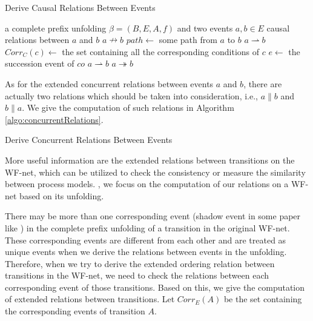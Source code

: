 \documentclass{llncs}
\begin{document}
\begin{algorithm}
\caption{Derive Causal Relations Between Events}
\label{algo:causalRelations}
	\begin{algorithmic}
		\Require a complete prefix unfolding $\beta=(B,E,A,f)$ and two events $a,b\in E$
		\Ensure causal relations between $a$ and $b$
			\State \Return $a\nrightarrow b$
		\EndIf
		\State $path\gets$ some path from $a$ to $b$
			\State \Return $a\rightharpoonup b$
		\Else
				\State $Corr_{C}(c)\gets$ the set containing all the corresponding conditions of $c$
					\State $e\gets$ the succession event of $co$
						\State \Return $a\rightharpoonup b$
					\EndIf
				\EndFor
			\EndFor
		\EndIf
		\State \Return $a\twoheadrightarrow b$
	\end{algorithmic}
\end{algorithm}

As for the extended concurrent relations between events $a$ and $b$, there are actually two relations which should be taken into consideration, i.e., $a\parallel b$ and $b\parallel a$. We give the computation of such relations in Algorithm \ref{algo:concurrentRelations}.

\begin{algorithm}
\caption{Derive Concurrent Relations Between Events}
\label{algo:concurrentRelations}
	\begin{algorithmic}
	\Ensure
	\end{algorithmic}
\end{algorithm}

More useful information are the extended relations between transitions on the WF-net, which can be utilized to check the consistency or measure the similarity between process models. , we focus on the computation of our relations on a WF-net based on its unfolding.

There may be more than one corresponding event (shadow event in some paper like \cite{wang2013efficient}) in the complete prefix unfolding of a transition in the original WF-net. These corresponding events are different from each other and are treated as unique events when we derive the relations between events in the unfolding. Therefore, when we try to derive the extended ordering relation between transitions in the WF-net, we need to check the relations between each corresponding event of those transitions. Based on this, we give the computation of extended relations between transitions. Let $Corr_{E}(A)$ be the set containing the corresponding events of transition $A$.
\end{document}
